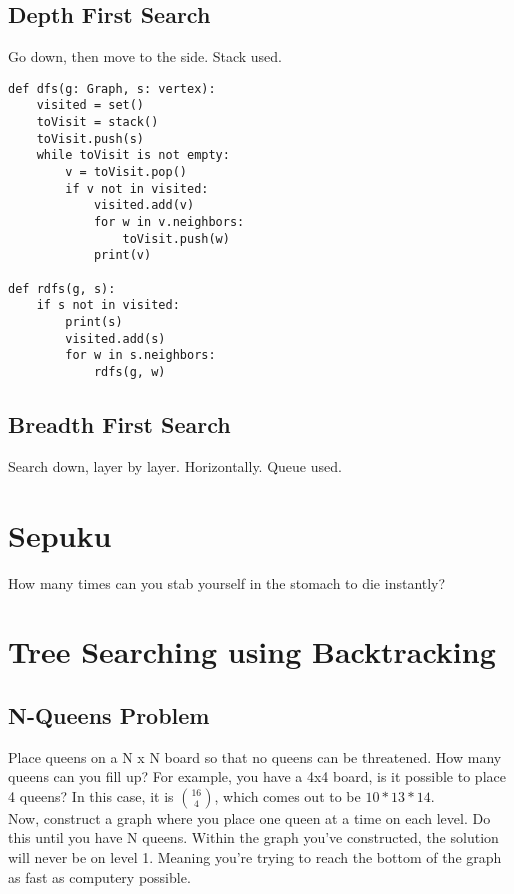 \documentclass{article}
\begin{document}
\subsection{Depth First Search}
\label{sec:orgaa121c2}
Go down, then move to the side. Stack used.
\begin{verbatim}
def dfs(g: Graph, s: vertex):
    visited = set()
    toVisit = stack()
    toVisit.push(s)
    while toVisit is not empty:
        v = toVisit.pop()
        if v not in visited:
            visited.add(v)
            for w in v.neighbors:
                toVisit.push(w)
            print(v)

def rdfs(g, s):
    if s not in visited:
        print(s)
        visited.add(s)
        for w in s.neighbors:
            rdfs(g, w)
\end{verbatim}

\subsection{Breadth First Search}
\label{sec:orgcccefbc}
Search down, layer by layer. Horizontally. Queue used.

\section{Sepuku}
\label{sec:org49f67d7}
How many times can you stab yourself in the stomach to die instantly?

\section{Tree Searching using Backtracking}
\label{sec:orga73b761}
\subsection{N-Queens Problem}
\label{sec:org6a77f57}
Place queens on a N x N board so that no queens can be threatened. How many queens can you fill up?
For example, you have a 4x4 board, is it possible to place 4 queens? In this case, it is \({16 \choose 4}\), which comes out to be \(10 * 13 * 14\). \\

Now, construct a graph where you place one queen at a time on each level. Do this until you have N queens. Within the graph you've constructed, the solution will never be on level 1. Meaning you're trying to reach the bottom of the graph as fast as computery possible.\\
\end{document}
